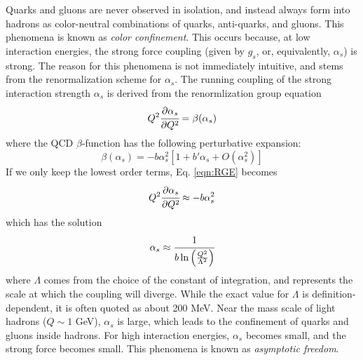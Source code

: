 

Quarks and gluons are never observed in isolation, and instead always form into hadrons as color-neutral combinations of quarks, anti-quarks, and gluons.
This phenomena is known as \textit{color confinement}.
This occurs because, at low interaction energies, the strong force coupling (given by $g_s$, or, equivalently, $\alpha_s$) is strong.
The reason for this phenomena is not immediately intuitive, and stems from the renormalization scheme for $\alpha_s$.
The running coupling of the strong interaction strength $\alpha_s$ is derived from the renormlization group equation
\begin{equation}
  Q^2 \cfrac{\partial \alpha_s}{\partial Q^2} = \beta(\alpha_s)
  \label{eqn:RGE}
\end{equation}
where the QCD $\beta$-function has the following perturbative expansion:
\begin{equation}
  \beta(\alpha_s) = -b \alpha_s^2 \left[1 + b'\alpha_s + O(\alpha_s^2)\right]
\end{equation}
If we only keep the lowest order terms, Eq. \ref{eqn:RGE} becomes
\begin{equation}
  Q^2 \cfrac{\partial \alpha_s}{\partial Q^2} \approx -b \alpha_s^2
\end{equation}
which has the solution
\begin{equation}
  \alpha_s \approx \cfrac{1}{b\ln\left(\frac{Q^2}{\Lambda^2}\right)}
\end{equation}
where $\Lambda$ comes from the choice of the constant of integration, and represents the scale at which the coupling will diverge.
While the exact value for $\Lambda$ is definition-dependent, it is often quoted as about 200 MeV.
Near the mass scale of light hadrons ($Q \sim 1$ GeV), $\alpha_s$ is large, which leads to the confinement of quarks and gluons inside hadrons.
For high interaction energies, $\alpha_s$ becomes small, and the strong force becomes small.
This phenomena is known as \textit{asymptotic freedom}.










